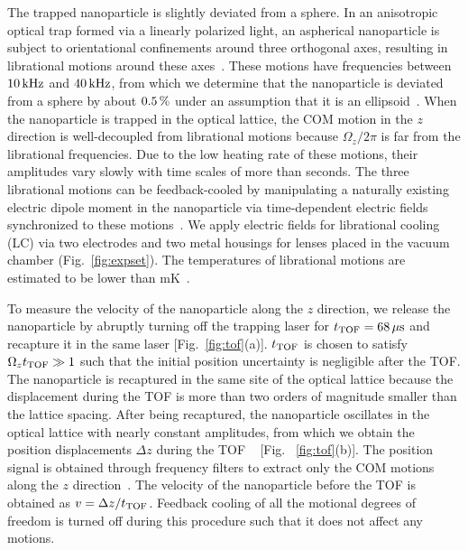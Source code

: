 \documentclass[aps, prl, 
amsmath, showpacs, preprintnumbers, twocolumn, amssymb, amsmath, superscriptaddress]{revtex4-1}
\begin{document}
The trapped nanoparticle is slightly deviated from a sphere. In an anisotropic optical trap formed via a linearly polarized light, an aspherical nanoparticle is subject to orientational confinements around three orthogonal axes, resulting in librational motions around these axes~\cite{ruijgrok2011brownian,trojek2012optical,ruijgrok2011brownian,hoang2016torsional,ahn2018optically,bang2020five,van2021sub,kamba2023nanoscale}. These motions have frequencies between $\unit[10]{kHz}$ and $\unit[40]{kHz}$, from which we determine that the nanoparticle is deviated from a sphere by about $\unit[0.5]{\%}$ under an assumption that it is an ellipsoid~\cite{kamba2023nanoscale}. When the nanoparticle is trapped in the optical lattice, the COM motion in the $z$ direction is well-decoupled from librational motions because $\Omega_z/2\pi$ is far from the librational frequencies. Due to the low heating rate of these motions, their amplitudes vary slowly with time scales of more than seconds. The three librational motions can be feedback-cooled by manipulating a naturally existing electric dipole moment in the nanoparticle via time-dependent electric fields synchronized to these motions~\cite{blakemore2022librational,kamba2023nanoscale}. We apply electric fields for librational cooling (LC) via two electrodes and two metal housings for lenses placed in the vacuum chamber (Fig.~\ref{fig:expset}). The temperatures of librational motions are estimated to be lower than \unit[30]{mK}~\cite{kamba2023nanoscale}. 



To measure the velocity of the nanoparticle along the $z$ direction, we release the nanoparticle by abruptly turning off the trapping laser for $t_{\rm TOF}=\unit[68]{\mu s}$ and recapture it in the same laser [Fig.~\ref{fig:tof}(a)].  $t_{\rm TOF}$ is chosen to satisfy $\Omega_z t_{\rm TOF} \gg 1$ such that the initial position uncertainty is negligible after the TOF. The nanoparticle is recaptured in the same site of the optical lattice because the displacement during the TOF is more than two orders of magnitude smaller than the lattice spacing. After being recaptured, the nanoparticle oscillates in the optical lattice with nearly constant amplitudes, from which we obtain the position displacements $\Delta z$ during the TOF ~\cite{hebestreit2018sensing} [Fig. ~\ref{fig:tof}(b)]. The position signal is obtained through frequency filters to extract only the COM motions along the $z$ direction~\cite{fnote7}. The velocity of the nanoparticle before the TOF is obtained as $v=\Delta z/t_{\rm TOF}$. Feedback cooling of all the motional degrees of freedom is turned off during this procedure such that it does not affect any motions. 
\end{document}
